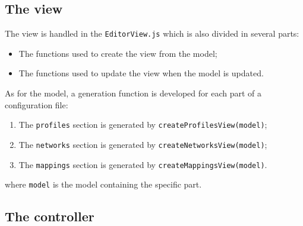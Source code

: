 \documentclass{article}
\begin{document}
\subsection{The view}

The view is handled in the \texttt{EditorView.js} which is also divided in several parts:
\begin{itemize}
\item The functions used to create the view from the model;
\item The functions used to update the view when the model is updated.
\end{itemize}

\noindent As for the model, a generation function is developed for each part of a configuration file:
\begin{enumerate}
\item The \texttt{profiles} section is generated by \texttt{createProfilesView(model)};
\item The \texttt{networks} section is generated by \texttt{createNetworksView(model)};
\item The \texttt{mappings} section is generated by \texttt{createMappingsView(model)}.
\end{enumerate}
\noindent where \texttt{model} is the model containing the specific part.
\newline

\subsection{The controller}
\end{document}
